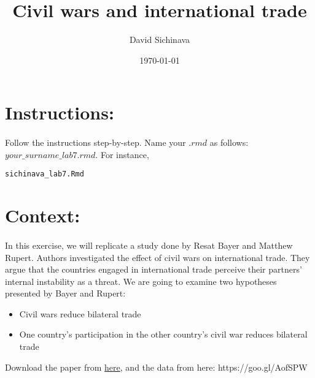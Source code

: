 \documentclass{article}\usepackage[]{graphicx}\usepackage[]{color}
\title{Civil wars and international trade}
\author{David Sichinava}
\date{\today}
\makeatletter
\newcommand{\hlstd}[1]{\textcolor[rgb]{0.345,0.345,0.345}{#1}}%
\newenvironment{kframe}{%
 \def\at@end@of@kframe{}%
 \ifinner\ifhmode%
  \def\at@end@of@kframe{\end{minipage}}%
  \begin{minipage}{\columnwidth}%
 \fi\fi%
 \def\FrameCommand##1{\hskip\@totalleftmargin \hskip-\fboxsep
 \colorbox{shadecolor}{##1}\hskip-\fboxsep
     \hskip-\linewidth \hskip-\@totalleftmargin \hskip\columnwidth}%
 \MakeFramed {\advance\hsize-\width
   \@totalleftmargin\z@ \linewidth\hsize
   \@setminipage}}%
 {\par\unskip\endMakeFramed%
 \at@end@of@kframe}
\newenvironment{knitrout}{}{} %
\makeatother
\begin{document}
\maketitle

\section*{Instructions:}

\paragraph{}

Follow the instructions step-by-step. Name your $.rmd$ as follows: $your\_surname\_lab7.rmd$. For instance,

\begin{knitrout}
\color{fgcolor}\begin{kframe}
\begin{alltt}
\hlstd{sichinava_lab7.Rmd}
\end{alltt}
\end{kframe}
\end{knitrout}

\section*{Context:}
\paragraph{}

In this exercise, we will replicate a study done by Resat Bayer and Matthew Rupert. Authors investigated the effect of civil wars on international trade. They argue that the countries engaged in international trade perceive their partners' internal instability as a threat. We are going to examine two hypotheses presented by Bayer and Rupert:

\begin{itemize}
\item{Civil wars reduce bilateral trade}
\item{One country's participation in the other country's civil war reduces bilateral trade}
\end{itemize}

Download the paper from  \href{https://www.dropbox.com/s/xsoyht80qkt0jmo/bayer2004.pdf?dl=0}{here}, and the data from here: https://goo.gl/AofSPW
\end{document}
